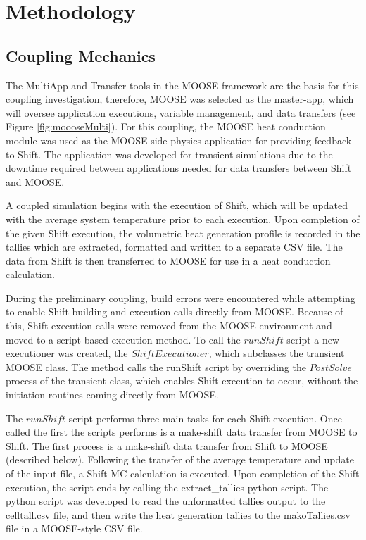\documentclass{anstrans}
\begin{document}
\section{Methodology}
 
\subsection{Coupling Mechanics}
The MultiApp and Transfer tools in the MOOSE framework are the basis for this coupling investigation, therefore, MOOSE was selected as the master-app, which will oversee application executions, variable management, and data transfers (see Figure \ref{fig:moooseMulti}). For this coupling, the MOOSE heat conduction module was used as the MOOSE-side physics application for providing feedback to Shift. The application was developed for transient simulations due to the downtime required between applications needed for data transfers between Shift and MOOSE. 

A coupled simulation begins with the execution of Shift, which will be updated with the average system temperature prior to each execution. Upon completion of the given Shift execution, the volumetric heat generation profile is recorded in the tallies which are extracted, formatted and written to a separate CSV file. The data from Shift is then transferred to MOOSE for use in a heat conduction calculation.

During the preliminary coupling, build errors were encountered while attempting to enable Shift building and execution calls directly from MOOSE. Because of this, Shift execution calls were removed from the MOOSE environment and moved to a script-based execution method. To call the $runShift$ script a new executioner was created, the $ShiftExecutioner$, which subclasses the transient MOOSE class. The method calls the runShift script by overriding the $PostSolve$ process of the transient class, which enables Shift execution to occur, without the initiation routines coming directly from MOOSE. 

The $runShift$ script performs three main tasks for each Shift execution. Once called the first the scripts performs is a make-shift data transfer from MOOSE to Shift. The first process is a make-shift data transfer from Shift to MOOSE (described below). Following the transfer of the average temperature and update of the input file, a Shift MC calculation is executed. Upon completion of the Shift execution, the script ends by calling the extract\_tallies python script. The python script was developed to read the unformatted tallies output to the celltall.csv file, and then write the heat generation tallies to the makoTallies.csv file in a MOOSE-style CSV file.
\end{document}
